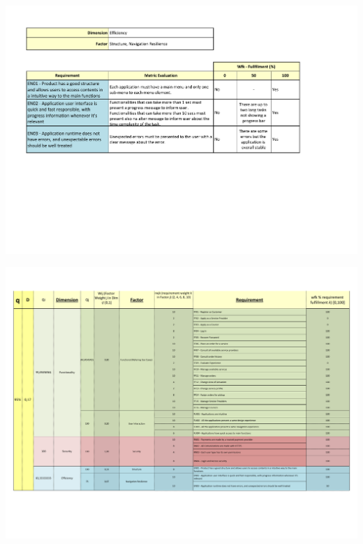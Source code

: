 \pagebreak

\includegraphics[page=1, angle=90,origin=c, width=\textwidth ]{appendices/QEF/Efficiency.pdf}

\pagebreak

\includegraphics[page=1, angle=90,origin=c, width=1.3\textwidth ]{appendices/QEF/QEF.pdf}

